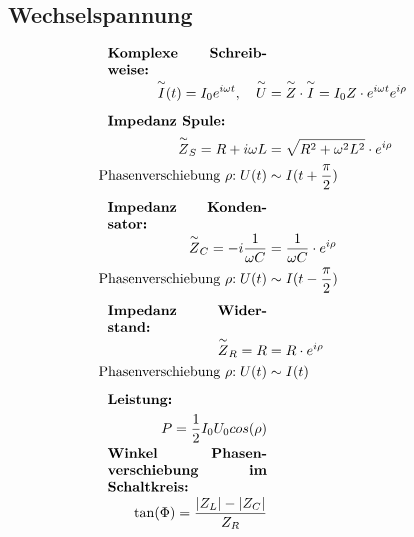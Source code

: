 \subsection{Wechselspannung}
    \vspace{-1em}
    \begin{align*}
        \parbox{4cm}{\textbf{Komplexe Schreibweise:}}\\
        \overset{\sim}{I}(t) = I_0 e^{i \omega t}, \quad \overset{\sim}{U} &= \overset{\sim}{Z} \cdot \overset{\sim}{I} = I_0 Z \cdot e^{i \omega t} e^{i \rho}
        \\[0.5em]
        \parbox{4cm}{\textbf{Impedanz Spule:}}\\
        \overset{\sim}{Z}_S = R + i \omega L &= \sqrt{R^2 + \omega^2 L ^2} \cdot e^{i \rho}\\
        \text{Phasenverschiebung $\rho$:} \; U(t) &\sim I(t + \frac{\pi}{2})
        \\[0.5em]
        \parbox{4cm}{\textbf{Impedanz Kondensator:}}\\
        \overset{\sim}{Z}_C = - i\frac{1}{\omega C} &= \frac{1}{\omega C} \cdot e^{i \rho}\\
        \text{Phasenverschiebung $\rho$:} \; U(t) &\sim I(t - \frac{\pi}{2})
        \\[0.5em]
        \parbox{4cm}{\textbf{Impedanz Widerstand:}}\\
        \overset{\sim}{Z}_R = R &= R \cdot e^{i \rho}\\
        \text{Phasenverschiebung $\rho$:} \; U(t) &\sim I(t)
        \\[0.5em]
        \parbox{4cm}{\textbf{Leistung:}}\\
        P = \frac{1}{2} I_0 U_0 cos(\rho)\\
        \parbox{4cm}{\textbf{Winkel Phasenverschiebung im Schaltkreis:}}\\
        \tan(\Phi) = \frac{|Z_L| - |Z_C|}{Z_R}
    \end{align*}

